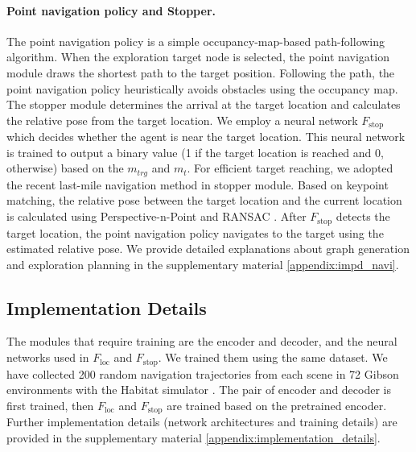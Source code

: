 \documentclass[10pt,twocolumn,letterpaper]{article}
\begin{document}
\paragraph{Point navigation policy and Stopper.}
The point navigation policy is a simple occupancy-map-based path-following algorithm.
%
When the exploration target node is selected, the point navigation module draws the shortest path to the target position.
%
Following the path, the point navigation policy heuristically avoids obstacles using the occupancy map. 
%
The stopper module determines the arrival at the target location and calculates the relative pose from the target location.
%
We employ a neural network $F_\mathrm{stop}$ which decides whether the agent is near the target location.
%
This neural network is trained to output a binary value (1 if the target location is reached and 0, otherwise) based on the $m_{trg}$ and $m_t$.
%
For efficient target reaching, we adopted the recent last-mile navigation method\cite{SLING} in stopper module.
%
Based on keypoint matching, the relative pose between the target location and the current location is calculated using Perspective-n-Point \cite{epnp} and RANSAC \cite{ransac}.
%
After $F_\mathrm{stop}$ detects the target location, the point navigation policy navigates to the target using the estimated relative pose. 
We provide detailed explanations about graph generation and exploration planning in the supplementary material \ref{appendix:impd_navi}.

\subsection{Implementation Details}
The modules that require training are the encoder and decoder, and the neural networks used in $F_\mathrm{loc}$ and $F_\mathrm{stop}$.
%
We trained them using the same dataset. 
%
We have collected 200 random navigation trajectories from each scene in 72 Gibson \cite{xiazamirhe2018gibsonenv} environments with the Habitat simulator \cite{habitat}.
%
The pair of encoder and decoder is first trained, then $F_\mathrm{loc}$ and $F_\mathrm{stop}$ are trained based on the pretrained encoder.
%
Further implementation details (network architectures and training details) are provided in the supplementary material \ref{appendix:implementation_details}.


\end{document}
